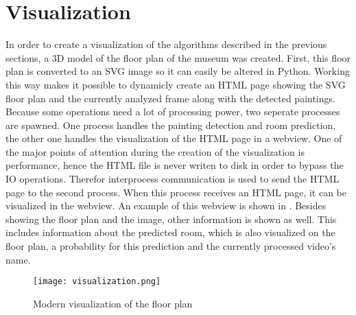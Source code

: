 \section{Visualization}

In order to create a visualization of the algorithms described in the previous sections, a 3D model of the floor plan of the museum was created. First, this floor plan is converted to an SVG image so it can easily be altered in Python. Working this way makes it possible to dynamicly create an HTML page showing the SVG floor plan and the currently analyzed frame along with the detected paintings. Because some operations need a lot of processing power, two seperate processes are spawned. One process handles the painting detection and room prediction, the other one handles the visualization of the HTML page in a webview. One of the major points of attention during the creation of the visualization is performance, hence the HTML file is never writen to disk in order to bypass the IO operations. Therefor interprocess communication is used to send the HTML page to the second process. When this process receives an HTML page, it can be visualized in the webview. An example of this webview is shown in . Besides showing the floor plan and the image, other information is shown as well. This includes information about the predicted room, which is also visualized on the floor plan, a probability for this prediction and the currently processed video's name.

\begin{figure}
    \centering
    \texttt{[image: visualization.png]}
    \label{fig:webview}
    \caption{Modern visualization of the floor plan}
\end{figure}

